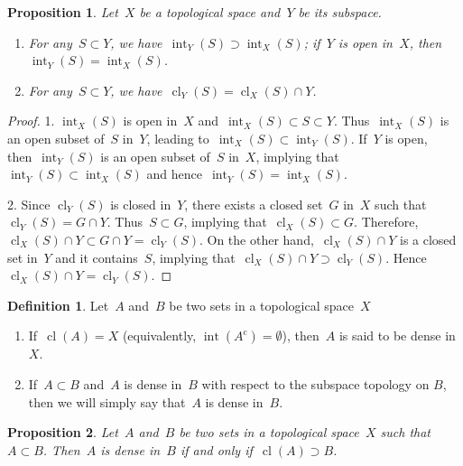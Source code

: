 \documentclass[11pt,a4paper]{article}  %
\newtheorem{proposition}{Proposition}[section]
\theoremstyle{definition}
\newtheorem{definition}{Definition}[section]
\newcommand{\co}{{\mathrm{c}}}
\DeclareMathOperator{\inter}{int}
\DeclareMathOperator{\cl}{cl}
\numberwithin{equation}{section}
\begin{document}
\begin{proposition}
  \label{prop:subintcl}
  Let~$X$ be a topological space and~$Y$ be its subspace.
  \begin{enumerate}
    \item For any~$S\subset Y$, we have~$\inter_Y(S) \supset \inter_X(S)$;
      if~$Y$ is open in~$X$, then $\inter_Y(S)=\inter_X(S)$.
    \item For any~$S\subset Y$, we have~$\cl_Y(S) = \cl_X(S) \cap Y$.
  \end{enumerate}
\end{proposition}


\begin{proof}
  1. $\inter_X(S)$ is open in~$X$ and~$\inter_X(S)\subset S\subset Y$. Thus~$\inter_X(S)$ is an open
     subset of~$S$ in~$Y$, leading to~$\inter_X(S)\subset \inter_Y(S)$. If~$Y$ is open,
     then~$\inter_Y(S)$ is an open subset of~$S$ in~$X$, implying that~$\inter_Y(S)\subset
     \inter_X(S)$ and hence~$\inter_Y(S) = \inter_X(S)$.

  2. %
     Since $\cl_Y(S)$ is closed in~$Y$, there exists a closed set~$G$ in~$X$ such
     that~$\cl_Y(S)= G\cap Y$. Thus~$S\subset  G$, implying that~$\cl_X(S) \subset G$.
     Therefore,~$\cl_X(S)\cap Y \subset G\cap Y = \cl_Y(S)$.  On the other hand,~$\cl_X(S)\cap Y$ is
     a closed set in~$Y$ and it contains~$S$, implying that~$\cl_X(S)\cap Y \supset \cl_Y(S)$.
     Hence~$\cl_X(S)\cap Y = \cl_Y(S)$.
\end{proof}

\begin{definition}
  \label{def:dense}
  Let~$A$ and~$B$ be two sets in a topological space~$X$
  \begin{enumerate}
      \item If~$\cl(A) = X$ (equivalently, $\inter(A^\co) = \emptyset$), then~$A$ is said to be dense in~$X$.
    \item If~$A\subset B$ and~$A$ is dense in~$B$ with respect to the subspace topology on $B$,
    then we will simply say that~$A$ is dense in~$B$.
  \end{enumerate}
\end{definition}

\begin{proposition}
  \label{prop:densein}
  Let~$A$ and~$B$ be two sets in a topological space~$X$ such that~$A\subset B$. Then~$A$ is dense
  in~$B$ if and only if~$\cl(A) \supset B$.
\end{proposition}
\end{document}
